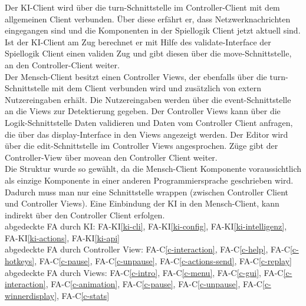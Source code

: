 Der KI-Client wird über die turn-Schnittstelle im Controller-Client mit dem allgemeinen Client verbunden. Über diese erfährt er, dass Netzwerknachrichten eingegangen sind und die Komponenten in der Spiellogik Client jetzt aktuell sind. Ist der KI-Client am Zug berechnet er mit Hilfe des validate-Interface der Spiellogik Client einen validen Zug und gibt diesen über die move-Schnittstelle, an den Controller-Client weiter.\\
Der Mensch-Client besitzt einen Controller Views, der ebenfalls über die turn-Schnittstelle mit dem Client verbunden wird und zusätzlich von extern Nutzereingaben erhält. Die Nutzereingaben werden über die event-Schnittstelle an die Views zur Detektierung gegeben. Der Controller Views kann über die Logik-Schnittstelle Daten validieren und Daten vom Controller Client anfragen, die über das display-Interface in den Views angezeigt werden. Der Editor wird über die edit-Schnittstelle im Controller Views angesprochen. Züge gibt der Controller-View über \glqq move\grqq an den Controller Client weiter.\\
Die Struktur wurde so gewählt, da die Mensch-Client Komponente voraussichtlich als einzige Komponente in einer anderen Programmiersprache geschrieben wird. Dadurch muss man nur eine Schnittstelle wrappen (zwischen Controller Client und Controller Views). Eine Einbindung der KI in den Mensch-Client, kann indirekt über den Controller Client erfolgen.\\
abgedeckte FA durch KI: FA-KI\ref{ki-cli}, FA-KI\ref{ki-config}, FA-KI\ref{ki-intelligenz}, FA-KI\ref{ki-actions}, FA-KI\ref{ki-api}\\
abgedeckte FA durch Controller View: FA-C\ref{c-interaction}, FA-C\ref{c-help}, FA-C\ref{c-hotkeys}, FA-C\ref{c-pause}, FA-C\ref{c-unpause}, FA-C\ref{c-actions-send}, FA-C\ref{c-replay}\\
abgedeckte FA durch Views: FA-C\ref{c-intro}, FA-C\ref{c-menu}, FA-C\ref{c-gui}, FA-C\ref{c-interaction}, FA-C\ref{c-animation}, FA-C\ref{c-pause}, FA-C\ref{c-unpause}, FA-C\ref{c-winnerdisplay}, FA-C\ref{c-stats}\\


